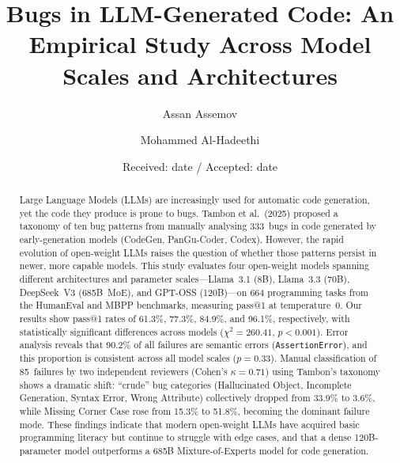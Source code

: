 \documentclass[smallextended]{svjour3}
\begin{document}
\title{Bugs in LLM-Generated Code: An Empirical Study Across Model Scales and Architectures}

\author{Assan Assemov \and Mohammed Al-Hadeethi}


\date{Received: date / Accepted: date}

\maketitle

\begin{abstract}
Large Language Models (LLMs) are increasingly used for automatic code generation, yet the code they produce is prone to bugs. Tambon et al.\ (2025) proposed a taxonomy of ten bug patterns from manually analysing 333~bugs in code generated by early-generation models (CodeGen, PanGu-Coder, Codex). However, the rapid evolution of open-weight LLMs raises the question of whether those patterns persist in newer, more capable models. This study evaluates four open-weight models spanning different architectures and parameter scales---Llama~3.1 (8B), Llama~3.3 (70B), DeepSeek~V3 (685B~MoE), and GPT-OSS (120B)---on 664 programming tasks from the HumanEval and MBPP benchmarks, measuring pass@1 at temperature~0. Our results show pass@1 rates of 61.3\%, 77.3\%, 84.9\%, and 96.1\%, respectively, with statistically significant differences across models ($\chi^2=260.41$, $p<0.001$). Error analysis reveals that 90.2\% of all failures are semantic errors (\texttt{AssertionError}), and this proportion is consistent across all model scales ($p=0.33$). Manual classification of 85~failures by two independent reviewers (Cohen's $\kappa=0.71$) using Tambon's taxonomy shows a dramatic shift: ``crude'' bug categories (Hallucinated Object, Incomplete Generation, Syntax Error, Wrong Attribute) collectively dropped from 33.9\% to 3.6\%, while Missing Corner Case rose from 15.3\% to 51.8\%, becoming the dominant failure mode. These findings indicate that modern open-weight LLMs have acquired basic programming literacy but continue to struggle with edge cases, and that a dense 120B-parameter model outperforms a 685B Mixture-of-Experts model for code generation.

\end{abstract}
\end{document}
